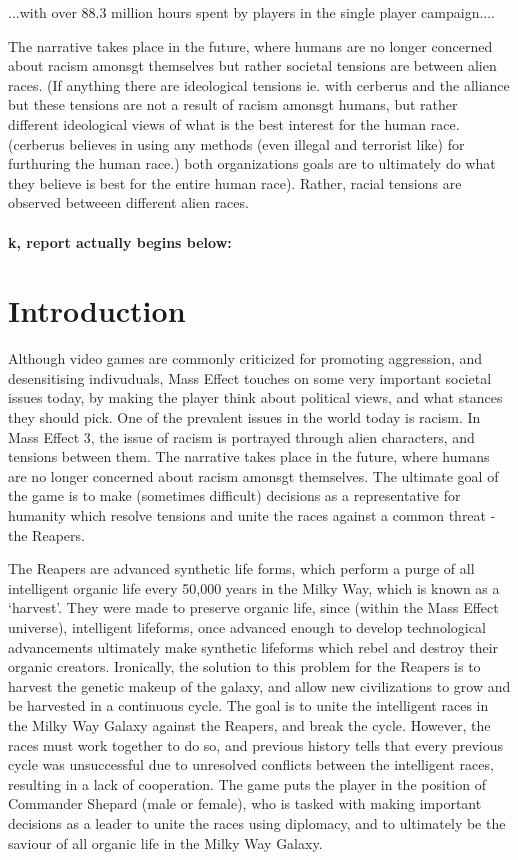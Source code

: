\documentclass[journal]{IEEEtran}
\begin{document}
...with over 88.3 million hours spent by players in the single player campaign.\cite{ea}...


The narrative takes place in the future, where humans are no longer concerned about racism amonsgt themselves but rather societal
tensions are between alien races. (If anything there are ideological tensions ie. with cerberus and the alliance but these
tensions are not a result of racism amonsgt humans, but rather different ideological views of what is the best interest for the human race. (cerberus believes in using any methods (even illegal and terrorist like) for furthuring the human race.)
both organizations goals are to ultimately do what they believe is best for the entire human race). Rather, racial tensions are observed betweeen different alien races.
\\ \\ \LARGE{\textbf{k, report actually begins below:}}
\normalsize
\section{Introduction}
Although video games are commonly criticized for promoting aggression, and desensitising indivuduals, Mass Effect touches on some very important societal issues today, by making the player think about political views,
and what stances they should pick. One of the prevalent issues in the world today is racism. In Mass Effect 3, the issue of racism is portrayed through alien characters, and tensions between them. The narrative takes place in the future, where humans are no longer concerned about racism amonsgt themselves. The ultimate goal of the game is to make (sometimes difficult) decisions as a representative for humanity which resolve tensions and unite the races against a common threat -the Reapers.

The Reapers are advanced synthetic life forms, which perform a purge of all intelligent organic life every 50,000 years in the Milky Way, which is known as a `harvest'. They were made to preserve organic life, since
(within the Mass Effect universe), intelligent lifeforms, once advanced
enough to develop technological advancements ultimately make synthetic
lifeforms which rebel and destroy their organic creators. Ironically,
the solution to this problem for the Reapers is to harvest the genetic makeup
of the galaxy, and allow new civilizations to grow and be harvested in a continuous cycle. The goal is to unite the intelligent
races in the Milky Way Galaxy against the Reapers, and break the cycle.
However, the races must work together to do so,
and previous history tells that every previous cycle was
unsuccessful due to unresolved conflicts between the intelligent races, resulting in a lack of cooperation. The game puts the player in the position of Commander Shepard (male or female), who is tasked with making important decisions as a leader to unite the races using diplomacy, and to ultimately be the saviour of all organic life in the Milky Way Galaxy.
\end{document}
